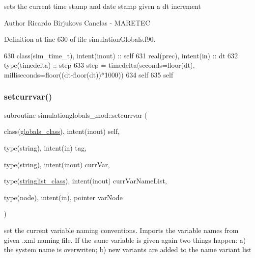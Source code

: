 sets the current time stamp and date stamp given a dt increment 

\begin{DoxyAuthor}{Author}
Ricardo Birjukovs Canelas -\/ M\+A\+R\+E\+T\+EC 
\end{DoxyAuthor}


Definition at line 630 of file simulation\+Globals.\+f90.


\begin{DoxyCode}
630     \textcolor{keywordtype}{class}(sim\_time\_t), \textcolor{keywordtype}{intent(inout)} :: self
631     \textcolor{keywordtype}{real(prec)}, \textcolor{keywordtype}{intent(in)} :: dt
632     \textcolor{keywordtype}{type}(timedelta) :: step
633     step = timedelta(seconds=floor(dt), milliseconds=floor((dt-floor(dt))*1000))
634     self%
635     self%
\end{DoxyCode}
\mbox{\label{namespacesimulationglobals__mod_a4dd64cb7a896b62d90e20a7eab65a6bf}} 
\subsubsection{\texorpdfstring{setcurrvar()}{setcurrvar()}}
{\footnotesize\ttfamily subroutine simulationglobals\+\_\+mod\+::setcurrvar (\begin{DoxyParamCaption}\item[{class(\mbox{\hyperlink{structsimulationglobals__mod_1_1globals__class}{globals\+\_\+class}}), intent(inout)}]{self,  }\item[{type(string), intent(in)}]{tag,  }\item[{type(string), intent(inout)}]{curr\+Var,  }\item[{type(\mbox{\hyperlink{structsimulationglobals__mod_1_1stringlist__class}{stringlist\+\_\+class}}), intent(inout)}]{curr\+Var\+Name\+List,  }\item[{type(node), intent(in), pointer}]{var\+Node }\end{DoxyParamCaption})\hspace{0.3cm}{\ttfamily [private]}}



set the current variable naming conventions. Imports the variable names from given .xml naming file. If the same variable is given again two things happen\+: a) the system name is overwriten; b) new variants are added to the name variant list 

